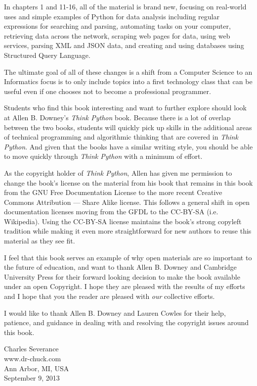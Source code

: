 \documentclass[11pt]{book}
\begin{document}
In chapters 1 and 11-16, all of the material is brand new, focusing
on real-world uses and simple examples of Python for data analysis 
including regular expressions for searching and parsing, 
automating tasks on your computer, retrieving data across 
the network, scraping web pages for data, 
using web services, parsing XML and JSON data, and creating 
and using databases using Structured Query Language.

The ultimate goal of all of these changes is a shift from a 
Computer Science to an Informatics
focus is to only include topics into a first technology 
class that can be useful even if one chooses not to 
become a professional programmer.

Students who find this book interesting and want to further explore
should look at Allen B. Downey's \emph{Think Python} book.  Because there
is a lot of overlap between the two books,
students will quickly pick up skills in the additional
areas of technical programming and algorithmic thinking 
that are covered in \emph{Think Python}.
And given that the books have a similar writing style, you should be 
able to move quickly through \emph{Think Python} with a minimum of effort.

As the copyright holder of \emph{Think Python},
Allen has given me permission to change the book's license 
on the material from his book that remains in this book
from the
GNU Free Documentation License 
to the more recent
Creative Commons Attribution --- Share Alike
license.
This follows a general shift in open documentation licenses moving 
from the GFDL to the CC-BY-SA (i.e. Wikipedia).
Using the CC-BY-SA license maintains the book's 
strong copyleft tradition while making it even more straightforward 
for new authors to reuse this material as they see fit.

I feel that this book serves an example of why open 
materials are so important to the future of education,
and want to thank Allen B. Downey and Cambridge University
Press for their forward looking decision to make the book available
under an open Copyright.   I hope they are pleased with the 
results of my efforts and I hope that you the reader are pleased with
\emph{our} collective efforts.

I would like to thank Allen B. Downey and Lauren Cowles for their help,
patience, and guidance in dealing with and resolving the copyright 
issues around this book.

Charles Severance\\
www.dr-chuck.com\\
Ann Arbor, MI, USA\\
September 9, 2013
\end{document}
